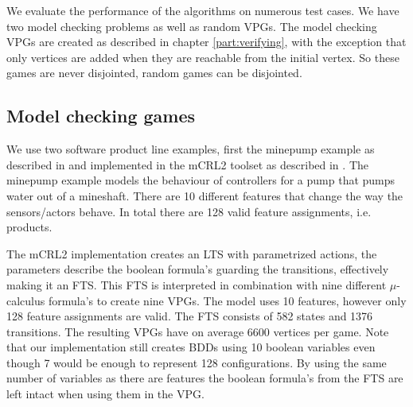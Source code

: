 We evaluate the performance of the algorithms on numerous test cases. We have two model checking problems as well as random VPGs. The model checking VPGs are created as described in chapter \ref{part:verifying}, with the exception that only vertices are added when they are reachable from the initial vertex. So these games are never disjointed, random games can be disjointed.

\subsection{Model checking games}
We use two software product line examples, first the minepump example as described in \cite{Kramer1983CONICAI} and implemented in the mCRL2 toolset as described in \cite{FamBasedModelCheckingWithMCRL2}. The minepump example models the behaviour of controllers for a pump that pumps water out of a mineshaft. There are 10 different features that change the way the sensors/actors behave. In total there are 128 valid feature assignments, i.e. products. 

The mCRL2 implementation creates an LTS with parametrized actions, the parameters describe the boolean formula's guarding the transitions, effectively making it an FTS. This FTS is interpreted in combination with nine different $\mu$-calculus formula's to create nine VPGs. The model uses 10 features, however only 128 feature assignments are valid. The FTS consists of 582 states and 1376 transitions. The resulting VPGs have on average 6600 vertices per game. Note that our implementation still creates BDDs using 10 boolean variables even though 7 would be enough to represent 128 configurations. By using the same number of variables as there are features the boolean formula's from the FTS are left intact when using them in the VPG.

